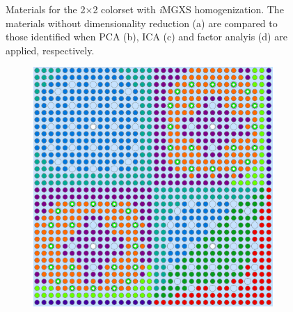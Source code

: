 \begin{appendices}
\begin{figure}[h!]
\begin{subfigure}{0.48\textwidth}
  \caption{}
  \label{fig:2x2-combined-factor-analysis-2}
\end{subfigure}
\caption[Clustered geometries with dimensionality reduction]{Materials for the 2$\times$2 colorset with \textit{i}\ac{MGXS} homogenization. The materials without dimensionality reduction (a) are compared to those identified when PCA (b), ICA (c) and factor analyis (d) are applied, respectively.}
\label{fig:dimension-reduce-2x2-geometries}
\end{figure}

\clearpage

\begin{figure}[h!]
\centering
\begin{subfigure}{0.48\textwidth}
  \centering
  \includegraphics[width=0.95\linewidth]{figures/unsupervised/geometries/dimension-reduce/reflector/no-reduce}
  \caption{}
  \label{fig:refl-combined-no-reduce}
\end{subfigure}%
\begin{subfigure}{0.48\textwidth}
  \centering

\end{subfigure}
\end{figure}
\end{appendices}
